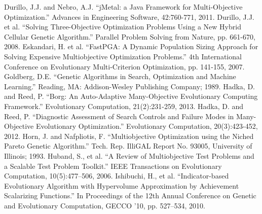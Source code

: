 \newline
\newline
\noindent
Durillo, J.J. and Nebro, A.J.  ``jMetal: a Java Framework for Multi-Objective Optimization.''  Advances in Engineering Software, 42:760-771, 2011.
\newline
\newline
\noindent
Durillo, J.J. et al.  ``Solving Three-Objective Optimization Problems Using a New Hybrid Cellular Genetic Algorithm.''  Parallel Problem Solving from Nature, pp. 661-670, 2008.
\newline
\newline
\noindent
Eskandari, H. et al.  ``FastPGA: A Dynamic Population Sizing Approach for Solving Expensive Multiobjective Optimization Problems.''  4th International Conference on Evolutionary Multi-Criterion Optimization, pp. 141-155, 2007.
\newline
\newline
\noindent
Goldberg, D.E.  ``Genetic Algorithms in Search, Optimization and Machine Learning.'' Reading, MA: Addison-Wesley Publishing Company; 1989.
\newline
\newline
\noindent
Hadka, D. and Reed, P. ``Borg: An Auto-Adaptive Many-Objective Evolutionary Computing Framework.'' Evolutionary Computation, 21(2):231-259, 2013.
\newline
\newline
\noindent
Hadka, D. and Reed, P. ``Diagnostic Assessment of Search Controls and Failure Modes in Many-Objective Evolutionary Optimization.'' Evolutionary Computation, 20(3):423-452, 2012.
\newline
\newline
\noindent
Horn, J. and  Nafpliotis, F.  ``Multiobjective Optimization using the Niched Pareto Genetic Algorithm.''  Tech. Rep. IlliGAL Report No. 93005, University of Illinois; 1993.
\newline
\newline
\noindent
Huband, S., et al.  ``A Review of Multiobjective Test Problems and a Scalable Test Problem Toolkit.''  IEEE Transactions on Evolutionary Computation, 10(5):477–506, 2006.
\newline
\newline
\noindent
Ishibuchi, H., et al.  ``Indicator-based Evolutionary Algorithm with Hypervolume Approximation by Achievement Scalarizing Functions.''  In Proceedings of the 12th Annual Conference on Genetic and Evolutionary Computation, GECCO ’10, pp. 527–534, 2010.
\newline
